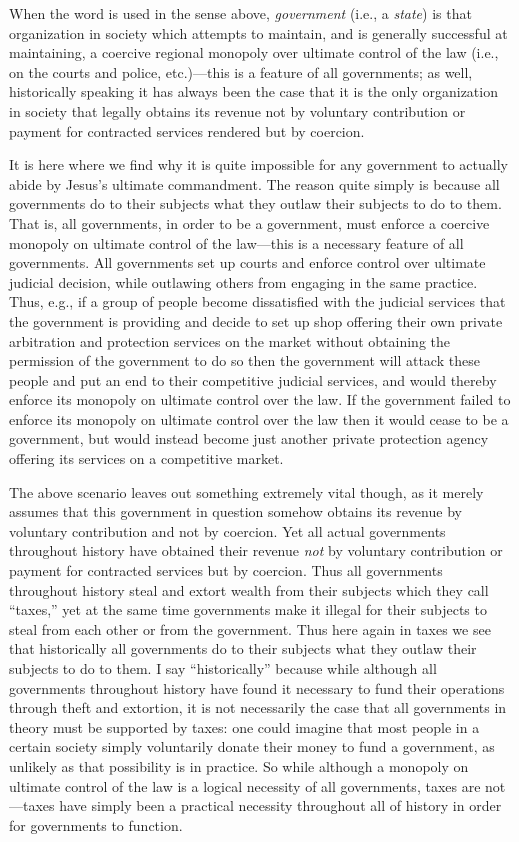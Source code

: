 \documentclass[letterpaper,12pt]{article}
\begin{document}
When the word is used in the sense above, \emph{government} (i.e., a \emph{state}) is that organization in society which attempts to maintain, and is generally successful at maintaining, a coercive regional monopoly over ultimate control of the law (i.e., on the courts and police, etc.)---this is a feature of all governments; as well, historically speaking it has always been the case that it is the only organization in society that legally obtains its revenue not by voluntary contribution or payment for contracted services rendered but by coercion.

It is here where we find why it is quite impossible for any government to actually abide by Jesus's ultimate commandment. The reason quite simply is because all governments do to their subjects what they outlaw their subjects to do to them. That is, all governments, in order to be a government, must enforce a coercive monopoly on ultimate control of the law---this is a necessary feature of all governments. All governments set up courts and enforce control over ultimate judicial decision, while outlawing others from engaging in the same practice. Thus, e.g., if a group of people become dissatisfied with the judicial services that the government is providing and decide to set up shop offering their own private arbitration and protection services on the market without obtaining the permission of the government to do so then the government will attack these people and put an end to their competitive judicial services, and would thereby enforce its monopoly on ultimate control over the law. If the government failed to enforce its monopoly on ultimate control over the law then it would cease to be a government, but would instead become just another private protection agency offering its services on a competitive market.

The above scenario leaves out something extremely vital though, as it merely assumes that this government in question somehow obtains its revenue by voluntary contribution and not by coercion. Yet all actual governments throughout history have obtained their revenue \emph{not} by voluntary contribution or payment for contracted services but by coercion. Thus all governments throughout history steal and extort wealth from their subjects which they call ``taxes,'' yet at the same time governments make it illegal for their subjects to steal from each other or from the government. Thus here again in taxes we see that historically all governments do to their subjects what they outlaw their subjects to do to them. I say ``historically'' because while although all governments throughout history have found it necessary to fund their operations through theft and extortion, it is not necessarily the case that all governments in theory must be supported by taxes: one could imagine that most people in a certain society simply voluntarily donate their money to fund a government, as unlikely as that possibility is in practice. So while although a monopoly on ultimate control of the law is a logical necessity of all governments, taxes are not---taxes have simply been a practical necessity throughout all of history in order for governments to function.
\end{document}
